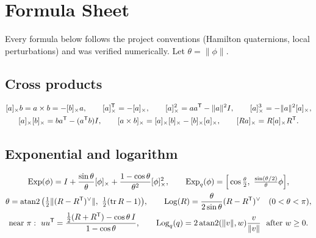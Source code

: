 \chapter{Formula Sheet}
\label{app:formulas}

Every formula below follows the project conventions (Hamilton quaternions, local perturbations) and was verified numerically. Let
$\theta = \|\phi\|$.

\section*{Cross products}
\begin{gather*}
  \sx{a}b = a\times b = -\sx{b}a, \qquad \sx{a}\T = -\sx{a}, \qquad \sx{a}^2 = aa\T - \|a\|^2I, \qquad \sx{a}^3 = -\|a\|^2\sx{a}, \\
  \sx{a}\sx{b} = ba\T - (a\T b)I, \qquad \sx{a\times b} = \sx{a}\sx{b} - \sx{b}\sx{a}, \qquad \sx{Ra} = R\sx{a}R\T .
\end{gather*}

\section*{Exponential and logarithm}
\begin{gather*}
  \Exp(\phi) = I + \frac{\sin\theta}{\theta}\sx{\phi} + \frac{1 - \cos\theta}{\theta^2}\sx{\phi}^2, \qquad
  \Exp_q(\phi) = \Big[\cos\tfrac\theta2,\ \tfrac{\sin(\theta/2)}{\theta}\phi\Big], \\
  \theta = \atantwo\big(\tfrac12\|(R - R\T)\veeop\|,\ \tfrac12(\tr R - 1)\big), \qquad
  \Log(R) = \frac{\theta}{2\sin\theta}(R - R\T)\veeop \quad (0 < \theta < \pi), \\
  \text{near }\pi:\ uu\T = \frac{\tfrac12(R + R\T) - \cos\theta\,I}{1 - \cos\theta}, \qquad
  \Log_q(q) = 2\atantwo(\|v\|, w)\frac{v}{\|v\|}\ \text{ after } w \ge 0 .
\end{gather*}

